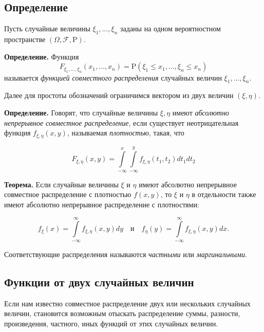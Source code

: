 \documentclass[11pt,a4paper]{article}
\begin{document}
    \hypertarget{ux43eux43fux440ux435ux434ux435ux43bux435ux43dux438ux435}{%
\subsection{Определение}\label{ux43eux43fux440ux435ux434ux435ux43bux435ux43dux438ux435}}

Пусть случайные величины \(\xi_1, \ldots, \xi_n\) заданы на одном
вероятностном пространстве \((\Omega, \mathcal{F}, \mathrm{P})\).

\textbf{Определение.} Функция \[
  F_{\xi_1, \ldots, \xi_n}(x_1, \ldots, x_n) = \mathrm{P}(\xi_1 \le x_1, \ldots, \xi_n \le x_n)
\] называется \emph{функцией совместного распределения} случайных
величин \(\xi_1, \ldots , \xi_n\).

Далее для простоты обозначений ограничимся вектором из двух величин
\((\xi, \eta)\).

\textbf{Определение.} Говорят, что случайные величины \(\xi, \eta\)
имеют \emph{абсолютно непрерывное совместное распределение}, если
существует неотрицательная функция \(f_{\xi, \eta}(x, y)\), называемая
\emph{плотностью}, такая, что

\[
  F_{\xi, \eta}(x, y) = \int\limits_{-\infty}^{x} \int\limits_{-\infty}^{y} f_{\xi, \eta}(t_1, t_2) dt_1 dt_2
\]

\textbf{Теорема.} Если случайные величины \(\xi\) и \(\eta\) имеют
абсолютно непрерывное совместное распределение с плотностью \(f(x, y)\),
то \(\xi\) и \(\eta\) в отдельности также имеют абсолютно непрерывное
распределение с плотностями:

\[
  f_{\xi}(x) = \int\limits_{-\infty}^{\infty} f_{\xi, \eta}(x, y)dy \quad \mathrm{и} \quad f_{\eta}(y) = \int\limits_{-\infty}^{\infty} f_{\xi, \eta}(x, y)dx.
\]

Соответствующие распределения называются \emph{частными} или
\emph{маргинальными}.

    \hypertarget{ux444ux443ux43dux43aux446ux438ux438-ux43eux442-ux434ux432ux443ux445-ux441ux43bux443ux447ux430ux439ux43dux44bux445-ux432ux435ux43bux438ux447ux438ux43d}{%
\subsection{Функции от двух случайных
величин}\label{ux444ux443ux43dux43aux446ux438ux438-ux43eux442-ux434ux432ux443ux445-ux441ux43bux443ux447ux430ux439ux43dux44bux445-ux432ux435ux43bux438ux447ux438ux43d}}

Если нам известно совместное распределение двух или нескольких случайных
величин, становится возможным отыскать распределение суммы, разности,
произведения, частного, иных функций от этих случайных величин.
\end{document}
